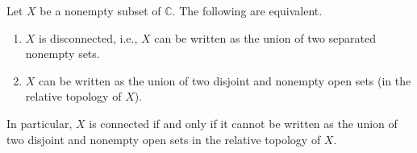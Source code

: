 \begin{svgraybox}
	\begin{theorem} \label{thm:disconnected_set}
		Let $X$ be a nonempty subset of $\mathbb{C}$. The following  are equivalent.
		\begin{enumerate}
			\item $X$ is disconnected, i.e., $X$ can be written as the union of two separated nonempty sets.
			\item $X$ can be written as the union of two disjoint and nonempty open sets (in the relative topology of $X$).
		\end{enumerate}
		In particular, $X$ is connected if and only if it cannot be written as the union of two disjoint and nonempty open sets in the relative topology of $X$.
	\end{theorem}
\end{svgraybox}

